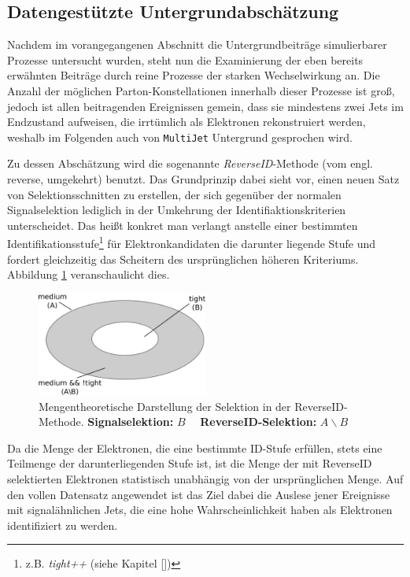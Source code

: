 \subsection{Datengestützte Untergrundabschätzung}
\label{afb:multijet}
Nachdem im vorangegangenen Abschnitt die Untergrundbeiträge simulierbarer
Prozesse untersucht wurden, steht nun die Examinierung der eben bereits
erwähnten Beiträge durch reine Prozesse der starken Wechselwirkung an. Die
Anzahl der möglichen Parton-Konstellationen innerhalb dieser Prozesse ist groß,
jedoch ist allen beitragenden Ereignissen gemein, dass sie mindestens zwei Jets
im Endzustand aufweisen, die irrtümlich als Elektronen rekonstruiert werden,
weshalb im Folgenden auch von \texttt{MultiJet} Untergrund gesprochen wird.

Zu dessen Abschätzung wird die sogenannte \textit{ReverseID}-Methode (vom engl.
reverse, umgekehrt) benutzt. Das Grundprinzip dabei sieht vor, einen neuen Satz
von Selektionsschnitten zu erstellen, der sich gegenüber der normalen
Signalselektion lediglich in der Umkehrung der Identifiaktionskriterien
unterscheidet. Das heißt konkret man verlangt anstelle einer bestimmten
Identifikationsstufe\footnote{z.B. \textit{tight++} (siehe Kapitel
\ref{})} für Elektronkandidaten die darunter liegende Stufe und fordert
gleichzeitig das Scheitern des ursprünglichen höheren Kriteriums. Abbildung
\ref{fig:reverseID} veranschaulicht dies.
\begin{figure}[h]
    \centering
    \includegraphics[width=0.5\textwidth]{img/reverseID}
    \caption[Mengentheoretische Darstellung der Selektion in der
        ReverseID-Methode]
        {Mengentheoretische Darstellung der Selektion in der ReverseID-Methode.
        \textbf{Signalselektion:} $B\quad$ \textbf{ReverseID-Selektion:}
        $A \backslash B$}
    \label{fig:reverseID}
\end{figure}
Da die Menge der Elektronen, die eine bestimmte ID-Stufe erfüllen, stets eine
Teilmenge der darunterliegenden Stufe ist, ist die Menge der mit ReverseID
selektierten Elektronen statistisch unabhängig von der ursprünglichen Menge.
Auf den vollen Datensatz angewendet ist das Ziel dabei die Auslese jener
Ereignisse mit signalähnlichen Jets, die eine hohe Wahrscheinlichkeit haben als
Elektronen identifiziert zu werden.

